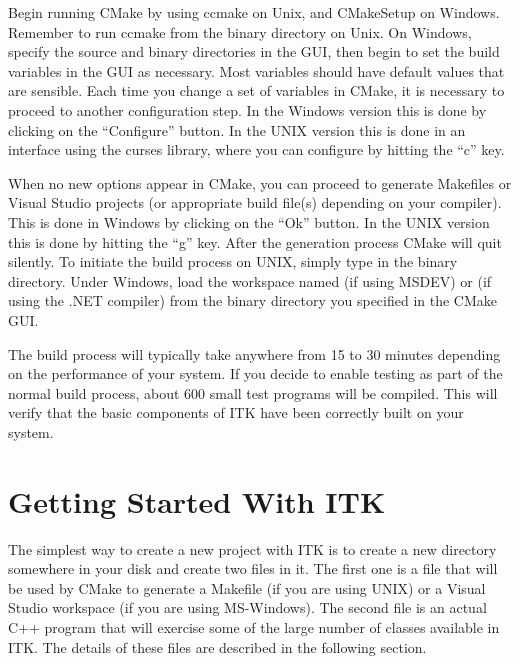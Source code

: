 Begin running CMake by using
ccmake on Unix, and CMakeSetup on
Windows. Remember to run ccmake from the binary directory on Unix. On
Windows, specify the source and binary directories in the GUI, then begin to
set the build variables in the GUI as necessary.  Most variables should have
default values that are sensible. Each time you change a set of variables in
CMake, it is necessary to proceed to another configuration step. In the
Windows version this is done by clicking on the ``Configure'' button. In the
UNIX version this is done in an interface using the 
curses library, where you can configure by hitting the ``c'' key.

When no new options appear in CMake, you can proceed to generate Makefiles or
Visual Studio projects (or appropriate build file(s) depending on your
compiler). This is done in Windows by clicking on the ``Ok'' button.  In the
UNIX version this is done by hitting the ``g'' key. After the generation
process CMake will quit silently. To initiate the build process on UNIX,
simply type  in the binary directory. Under Windows, load the
workspace named  (if using MSDEV) or  (if using
the .NET compiler) from the binary directory you specified in the CMake GUI.

The build process will typically take anywhere from 15 to 30 minutes depending
on the performance of your system. If you decide to enable testing as part of
the normal build process, about 600 small test programs will be compiled. This
will verify that the basic components of ITK have been correctly built on your
system.


\section{Getting Started With ITK }
\label{sec:GettingStartedWithITK}
 
The simplest way to create a new project with ITK is to create a new directory
somewhere in your disk and create two files in it. The first one is a
 file that will be used by CMake to generate a Makefile
(if you are using UNIX) or a Visual Studio workspace (if you are using
MS-Windows).  The second file is an actual C++ program that will exercise
some of the large number of classes available in ITK. The details of these files
are described in the following section.


